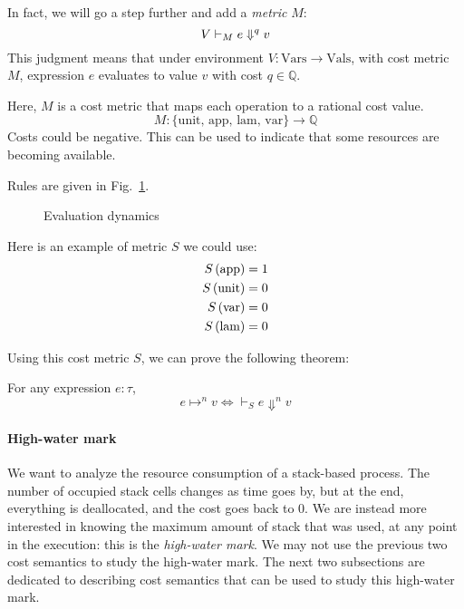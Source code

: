 \documentclass[ manuscript,screen, nonacm]{acmart}
\begin{document}
In fact, we will go a step further and add a \emph{metric} \(M\):
\[
  V \vdash_{M} e \Downarrow^{q}v
\]
This judgment means that under environment $V: \mathrm{Vars} \rightarrow \mathrm{Vals}$, with cost metric $M$,
expression $e$ evaluates to value $v$ with cost $q \in \mathbb{Q}$.

Here, \(M\) is a cost metric that maps each operation to a rational cost value.
\[
M: \{ \text{unit, app, lam, var} \} \rightarrow \mathbb{Q}
\] 
Costs could be negative. This can be used to indicate that some resources are becoming available.

Rules are given in Fig.~\ref{fig:eval-sem}.
\begin{figure}[htb]
\caption{Evaluation dynamics}
\label{fig:eval-sem}
\end{figure}


Here is an example of metric \(S\) we could use:
\begin{align}
S\left(\mathrm{app}\right)&=1 \\
S\left(\mathrm{unit}\right) &=0 \\
S\left(\mathrm{var}\right) &=0 \\
S\left(\mathrm{lam}\right) &=0
\end{align}

Using this cost metric $S$, we can prove the following theorem: 
\begin{theorem}\label{eq-big-small}
  For any expression \(e : \tau\),
  \[
  e \mapsto^n v \iff \vdash_S e \Downarrow^n v
  \]
\end{theorem}

\paragraph{High-water mark} We want to analyze the resource consumption of a stack-based process.
The number of occupied stack cells changes as time goes by, but at the end, everything 
is deallocated, and the cost goes back to \(0\). 
We are instead more interested in knowing the maximum amount of stack that
was used, at any point in the execution: this is the \emph{high-water mark}.
We may not use the previous two cost semantics to study the high-water mark.
%
The next two subsections are dedicated to describing cost semantics that 
can be used to study this high-water mark.
\end{document}
